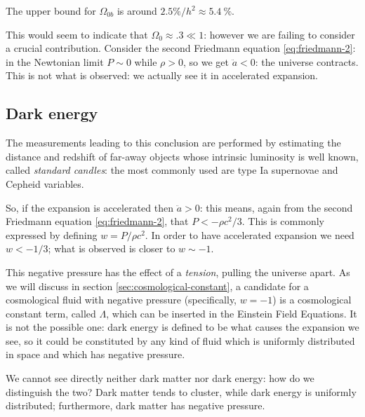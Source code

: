 \documentclass[main.tex]{subfiles}
\begin{document}
The upper bound for \(\Omega_{0b}\) is around \(2.5\%/h^2 \approx \SI{5.4}{\percent}\).



This would seem to indicate that \(\Omega_{0} \approx \num{.3} \ll 1\): however we are failing to consider a crucial contribution.
Consider the second Friedmann equation \eqref{eq:friedmann-2}: in the Newtonian limit \(P \sim 0\) while \( \rho >0 \), so we get \(\ddot{a} <0\): the universe contracts.
This is not what is observed: we actually see it in accelerated expansion.

\subsection{Dark energy}

The measurements leading to this conclusion are performed by estimating the distance and redshift of far-away objects whose intrinsic luminosity is well known, called \emph{standard candles}: the most commonly used are type Ia supernovae and Cepheid variables.

So, if the expansion is accelerated then \(\ddot{a} > 0\): this means, again from the second Friedmann equation \eqref{eq:friedmann-2}, that \(P < -\rho c^2/3\).
This is commonly expressed by defining \(w = P / \rho c^2\). 
In order to have accelerated expansion we need \(w < -1/3\); what is observed is closer to \(w \sim -1\).

This negative pressure has the effect of a \emph{tension}, pulling the universe apart.
As we will discuss in section \ref{sec:cosmological-constant}, a candidate for a cosmological fluid with negative pressure (specifically, \(w = -1\)) is a cosmological constant term, called \(\Lambda \), which can be inserted in the Einstein Field Equations.
It is not the possible one: dark energy is defined to be what causes the expansion we see, so it could be constituted by any kind of fluid which is uniformly distributed in space and which has negative pressure. 


We cannot see directly neither dark matter nor dark energy: how do we distinguish the two? Dark matter tends to cluster, while dark energy is uniformly distributed; furthermore, dark matter has negative pressure.
\end{document}
